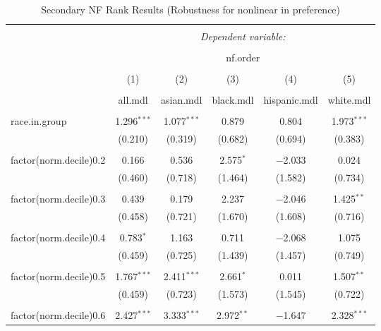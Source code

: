 
\begin{table}[!htbp] \centering 
  \caption{Secondary NF Rank Results (Robustness for nonlinear in preference)} 
  \label{} 
\begin{tabular}{@{\extracolsep{5pt}}lccccc} 
\\[-1.8ex]\hline 
\hline \\[-1.8ex] 
 & \multicolumn{5}{c}{\textit{Dependent variable:}} \\ 
\cline{2-6} 
\\[-1.8ex] & \multicolumn{5}{c}{nf.order} \\ 
\\[-1.8ex] & (1) & (2) & (3) & (4) & (5)\\ 
\\[-1.8ex] & all.mdl & asian.mdl & black.mdl & hispanic.mdl & white.mdl\\ 
\hline \\[-1.8ex] 
 race.in.group & 1.296$^{***}$ & 1.077$^{***}$ & 0.879 & 0.804 & 1.973$^{***}$ \\ 
  & (0.210) & (0.319) & (0.682) & (0.694) & (0.383) \\ 
  & & & & & \\ 
 factor(norm.decile)0.2 & 0.166 & 0.536 & 2.575$^{*}$ & $-$2.033 & 0.024 \\ 
  & (0.460) & (0.718) & (1.464) & (1.582) & (0.734) \\ 
  & & & & & \\ 
 factor(norm.decile)0.3 & 0.439 & 0.179 & 2.237 & $-$2.046 & 1.425$^{**}$ \\ 
  & (0.458) & (0.721) & (1.670) & (1.608) & (0.716) \\ 
  & & & & & \\ 
 factor(norm.decile)0.4 & 0.783$^{*}$ & 1.163 & 0.711 & $-$2.068 & 1.075 \\ 
  & (0.459) & (0.725) & (1.439) & (1.457) & (0.749) \\ 
  & & & & & \\ 
 factor(norm.decile)0.5 & 1.767$^{***}$ & 2.411$^{***}$ & 2.661$^{*}$ & 0.011 & 1.507$^{**}$ \\ 
  & (0.459) & (0.723) & (1.573) & (1.545) & (0.722) \\ 
  & & & & & \\ 
 factor(norm.decile)0.6 & 2.427$^{***}$ & 3.333$^{***}$ & 2.972$^{**}$ & $-$1.647 & 2.328$^{***}$ \\ 

\end{tabular}
\end{table}

